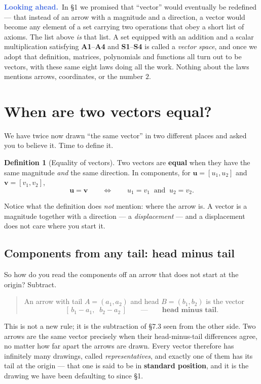 \documentclass[11pt]{article}
\theoremstyle{definition}
\newtheorem{defn}{Definition}[section]
\theoremstyle{remark}
\newcommand{\lookahead}{\par\smallskip\noindent
  \textbf{\sffamily\textcolor{RoyalBlue}{Looking ahead.}}\ \ignorespaces}
\newcommand{\vc}[1]{\mathbf{#1}}
\begin{document}
\lookahead In \S1 we promised that ``vector'' would eventually be redefined ---
that instead of an arrow with a magnitude and a direction, a vector would become
any element of a set carrying two operations that obey a short list of axioms.
The list above \emph{is} that list. A set equipped with an addition and a scalar
multiplication satisfying \textbf{A1}--\textbf{A4} and \textbf{S1}--\textbf{S4}
is called a \emph{vector space}, and once we adopt that definition, matrices,
polynomials and functions all turn out to be vectors, with these same eight laws
doing all the work. Nothing about the laws mentions arrows, coordinates, or the
number $2$.

\section{When are two vectors equal?}
We have twice now drawn ``the same vector'' in two different places and asked
you to believe it. Time to define it.

\begin{defn}[Equality of vectors]
Two vectors are \textbf{equal} when they have the same magnitude \emph{and} the
same direction. In components, for $\vc{u}=[u_1,u_2]$ and $\vc{v}=[v_1,v_2]$,
\[
  \vc{u}=\vc{v}
  \qquad\Longleftrightarrow\qquad
  u_1=v_1 \;\;\text{and}\;\; u_2=v_2 .
\]
\end{defn}

\noindent Notice what the definition does \emph{not} mention: where the arrow
is. A vector is a magnitude together with a direction --- a
\emph{displacement} --- and a displacement does not care where you start it.

\subsection*{Components from any tail: head minus tail}
So how do you read the components off an arrow that does not start at the
origin? Subtract.

\begin{quote}
An arrow with tail $A=(a_1,a_2)$ and head $B=(b_1,b_2)$ is the vector
\[
  [\,b_1-a_1,\;\;b_2-a_2\,]
  \qquad\text{---}\qquad
  \textbf{head minus tail}.
\]
\end{quote}

\noindent This is not a new rule; it is the subtraction of \S7.3 seen from the
other side. Two arrows are the same vector precisely when their
head-minus-tail differences agree, no matter how far apart the arrows are
drawn. Every vector therefore has infinitely many drawings, called
\emph{representatives}, and exactly one of them has its tail at the origin ---
that one is said to be in \textbf{standard position}, and it is the drawing we
have been defaulting to since \S1.
\end{document}
